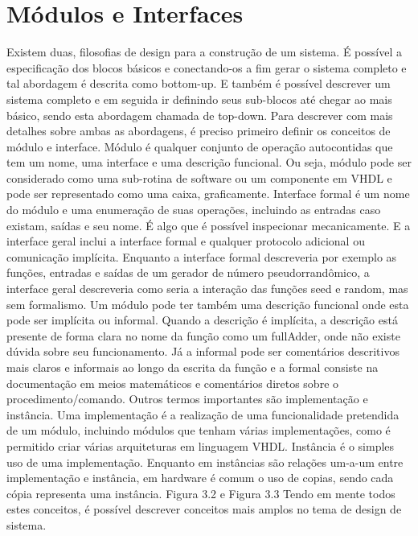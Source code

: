 \section{Módulos e Interfaces}
Existem duas, filosofias de design para a construção de um sistema. É possível a especificação dos blocos básicos e conectando-os a fim gerar o sistema completo e tal abordagem é descrita como bottom-up. E também é possível descrever um sistema completo e em seguida ir definindo seus sub-blocos até chegar ao mais básico, sendo esta abordagem chamada de top-down. Para descrever com mais detalhes sobre ambas as abordagens, é preciso primeiro definir os conceitos de módulo e interface.
Módulo é qualquer conjunto de operação autocontidas que tem um nome, uma interface e uma descrição funcional. Ou seja, módulo pode ser considerado como uma sub-rotina de software ou um componente em VHDL e pode ser representado como uma caixa, graficamente. Interface formal é um nome do módulo e uma enumeração de suas operações, incluindo as entradas caso existam, saídas e seu nome. É algo que é possível inspecionar mecanicamente. E a interface geral inclui a interface formal e qualquer protocolo adicional ou comunicação implícita. Enquanto a interface formal descreveria por exemplo as funções, entradas e saídas de um gerador de número pseudorrandômico, a interface geral descreveria como seria a interação das funções seed e random, mas sem formalismo. Um módulo pode ter também uma descrição funcional onde esta pode ser implícita ou informal. Quando a descrição é implícita, a descrição está presente de forma clara no nome da função como um fullAdder, onde não existe dúvida sobre seu funcionamento. Já a informal pode ser comentários descritivos mais claros e informais ao longo da escrita da função e a formal consiste na documentação em meios matemáticos e comentários diretos sobre o procedimento/comando.
Outros termos importantes são implementação e instância. Uma implementação é a realização de uma funcionalidade pretendida de um módulo, incluindo módulos que tenham várias implementações, como é permitido criar várias arquiteturas em linguagem VHDL. Instância é o simples uso de uma implementação. Enquanto em instâncias são relações um-a-um entre implementação e instância, em hardware é comum o uso de copias, sendo cada cópia representa uma instância.
Figura 3.2 e Figura 3.3
Tendo em mente todos estes conceitos, é possível descrever conceitos mais amplos no tema de design de sistema.



